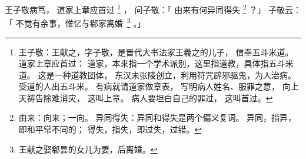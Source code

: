 
\switchcolumn*[\section{}]

王子敬病笃，
道家上章应首过%
\footnote{%
    王子敬：王献之，字子敬，是晋代大书法家王羲之的儿子，
            信奉五斗米道。
    道家上章应首过：
            道家，本来指一个学术派别，这里指道教，具体指五斗米道。
            这是一种道教团体，
            东汉未张陵创立，利用符咒辟邪驱鬼，为人治病。
            受道的人出五斗米。
            有病就请道家做章表，
            写明病人姓名、服罪之意，
            向上天祷告除难消灾，
            这叫上章。
            病人要坦白自己的罪过，
            这叫首过。
}%
，
问子敬：「
    由来有何异同得失%
    \footnote{%
        由来：向来；一向。
        异同得失：异同和得失是两个偏义复词。
                  异同，指异，即和平常不同的；
                  得失，指失，即过失，过错。
    }%
？」
子敬云：「
    不觉有余事，惟忆与郗家离\mbox{婚%
    \footnote{%
        王献之娶郗昙的女儿为妻，后离婚。       
    }}%
。」

\switchcolumn


